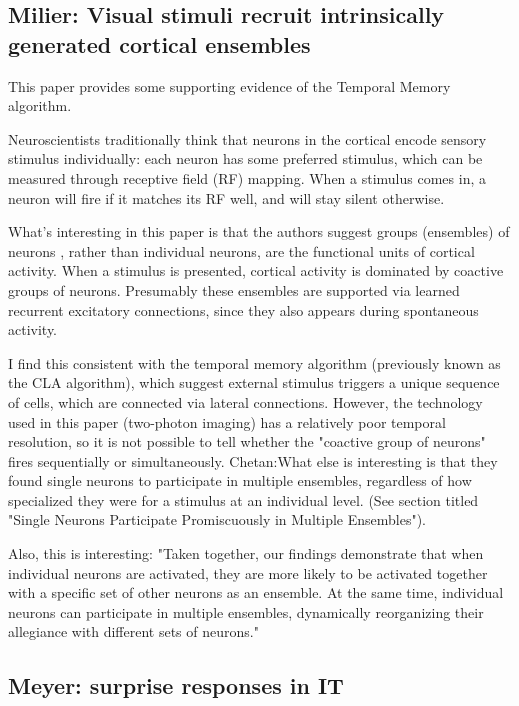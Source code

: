 \documentclass{article} %
\begin{document}
\subsection{Milier: Visual stimuli recruit intrinsically generated cortical ensembles}

This paper \cite{Miller2014} provides some supporting evidence of the Temporal Memory algorithm. 

Neuroscientists traditionally think that neurons in the cortical encode sensory
stimulus individually: each neuron has some preferred stimulus, which can be
measured through receptive field (RF) mapping. When a stimulus comes in, a
neuron will fire if it matches its RF well, and will stay silent otherwise.

What's interesting in this paper is that the authors suggest groups (ensembles)
of neurons , rather than individual neurons, are the functional units of
cortical activity. When a stimulus is presented, cortical activity is dominated
by coactive groups of neurons.  Presumably these ensembles are supported via
learned recurrent excitatory connections, since they also appears during
spontaneous activity.

I find this consistent with the temporal memory algorithm (previously known as
the CLA algorithm), which suggest external stimulus triggers a unique sequence
of cells, which are connected via lateral connections. However, the technology
used in this paper (two-photon imaging) has a relatively poor temporal
resolution, so it is not possible to tell whether the "coactive group of
neurons" fires sequentially or simultaneously.
Chetan:What else is interesting is that they found single neurons to participate
in multiple ensembles, regardless of how specialized they were for a stimulus at
an individual level. (See section titled "Single Neurons Participate
Promiscuously in Multiple Ensembles").

Also, this is interesting: "Taken together, our findings demonstrate that when
individual neurons are activated, they are more likely to be activated together
with a specific set of other neurons as an ensemble. At the same time,
individual neurons can participate in multiple ensembles, dynamically
reorganizing their allegiance with different sets of neurons."

\subsection{Meyer: surprise responses in IT}
\end{document}
